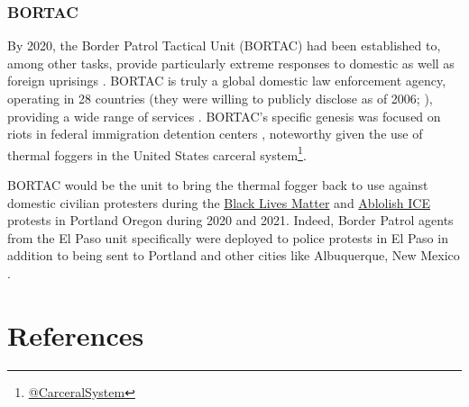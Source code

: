 \documentclass[
  11pt,
]{krantz}
\renewcommand{\href}[2]{#2\footnote{\url{#1}}}
\begin{document}
\hypertarget{bortac}{%
\subsection*{BORTAC}\label{bortac}}


By 2020, the Border Patrol Tactical Unit (BORTAC) had been established to, among other tasks, provide particularly extreme responses to domestic as well as foreign uprisings \citep{CBP2006, CBP2014, CBP2018}.
BORTAC is truly a global domestic law enforcement agency, operating in 28 countries (they were willing to publicly disclose as of 2006; \citet{CBP2006}), providing a wide range of services \citep{CBP2014, Miller2019}.
BORTAC's specific genesis was focused on riots in federal immigration detention centers \citep{CBP2006, CBP2014}, noteworthy given the use of thermal foggers in the United States \href{@CarceralSystem}{carceral system}.

BORTAC would be the unit to bring the thermal fogger back to use against domestic civilian protesters during the \protect\hyperlink{PortlandOR2020_07_29}{Black Lives Matter} and \protect\hyperlink{PortlandORICE2020_2021}{Ablolish ICE} protests in Portland Oregon during 2020 and 2021.
Indeed, Border Patrol agents from the El Paso unit specifically were deployed to police protests in El Paso in addition to being sent to Portland and other cities like Albuquerque, New Mexico \citep{Borunda2020}.

\hypertarget{References}{%
\chapter*{References}\label{References}}


  

\printindex
\end{document}
